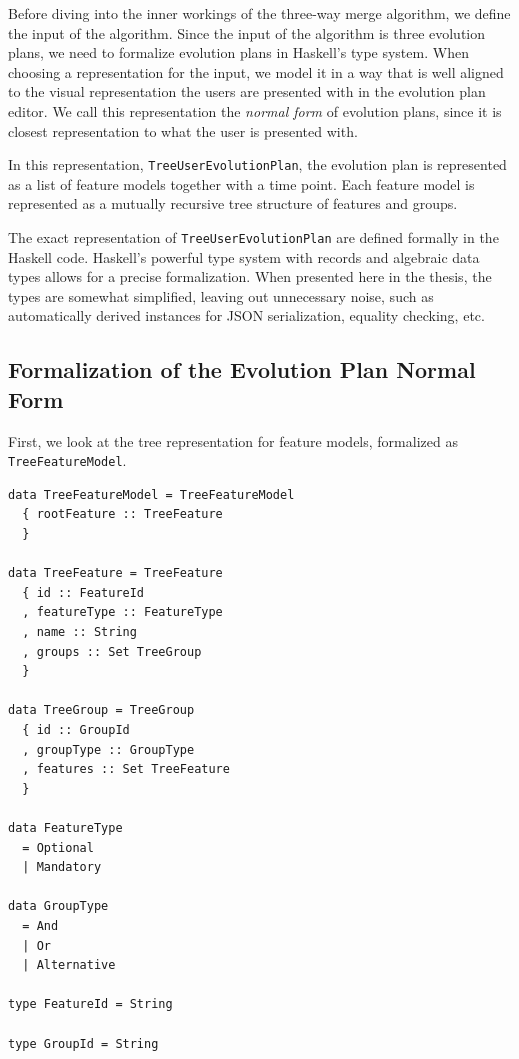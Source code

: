\documentclass[a4paper,english]{ifimaster}
\begin{document}
Before diving into the inner workings of the three-way merge algorithm, we define the input of the algorithm. Since the input of the algorithm is three evolution plans, we need to formalize evolution plans in Haskell's type system. When choosing a representation for the input, we model it in a way that is well aligned to the visual representation the users are presented with in the evolution plan editor. We call this representation the \textit{normal form} of evolution plans, since it is closest representation to what the user is presented with.

In this representation, \texttt{Tree\-User\-Evolution\-Plan}, the evolution plan is represented as a list of feature models together with a time point. Each feature model is represented as a mutually recursive tree structure of features and groups. 

The exact representation of \texttt{Tree\-User\-Evolution\-Plan} are defined formally in the Haskell code. Haskell's powerful type system with records and algebraic data types allows for a precise formalization. When presented here in the thesis, the types are somewhat simplified, leaving out unnecessary noise, such as automatically derived instances for JSON serialization, equality checking, etc.

\subsection{Formalization of the Evolution Plan Normal Form}%
\label{sub:formalization_of_the_evolution_plan_normal_form}

First, we look at the tree representation for feature models, formalized as \texttt{Tree\-Feature\-Model}.

\begin{verbatim}
data TreeFeatureModel = TreeFeatureModel
  { rootFeature :: TreeFeature
  }

data TreeFeature = TreeFeature
  { id :: FeatureId
  , featureType :: FeatureType
  , name :: String
  , groups :: Set TreeGroup
  }

data TreeGroup = TreeGroup
  { id :: GroupId
  , groupType :: GroupType
  , features :: Set TreeFeature
  }

data FeatureType
  = Optional
  | Mandatory

data GroupType
  = And
  | Or
  | Alternative

type FeatureId = String

type GroupId = String
\end{verbatim}
\end{document}
